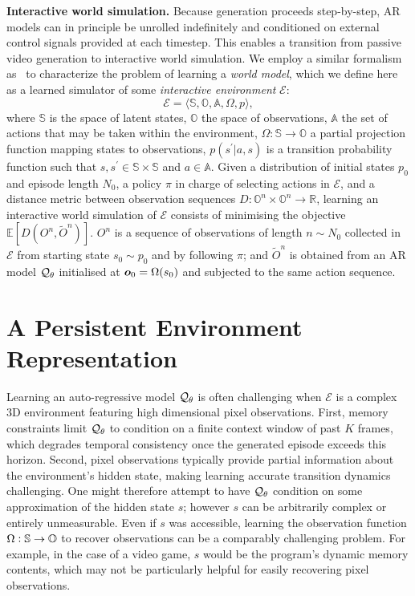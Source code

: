 \documentclass{article}
\theoremstyle{plain}
\theoremstyle{definition}
\theoremstyle{remark}
\begin{document}
\textbf{Interactive world simulation.} Because generation proceeds step-by-step, AR models can in principle be unrolled indefinitely and conditioned on external control signals provided at each timestep.
This enables a transition from passive video generation to interactive world simulation. We employ a similar formalism as~\citet{valevski2024diffusionmodelsrealtimegame} to characterize the problem of learning a \textit{world model}, which we define here as a learned simulator of some \textit{interactive environment} $\mathcal{E}$:
\begin{equation}
    \mathcal{E} = \langle \mathbb{S} , \mathbb{O}, \mathbb{A}, \Omega, p\rangle,
\end{equation}
 where $\mathbb{S}$ is the space of latent states, $\mathbb{O}$ the space of observations, $\mathbb{A}$ the set of actions that may be taken within the environment, $\Omega : \mathbb{S} \rightarrow \mathbb{O}$ a partial projection function mapping states to observations, $p(s^\prime|a,s)$ is a transition probability function such that $s,s^\prime \in \mathbb{S}\times\mathbb{S}$ and $a \in \mathbb{A}$. 
Given a distribution of initial states $p_0$ and episode length $N_0$, a policy $\pi$ in charge of selecting actions in $\mathcal{E}$, and a distance metric between observation sequences $D : \mathbb{O}^n \times \mathbb{O}^n \rightarrow \mathbb{R}$, learning an interactive world simulation of $\mathcal{E}$ consists of minimising the objective $\mathbb{E}[D(O^n, \tilde{O}^n)]$. $O^n$ is a sequence of observations of length $n\sim N_0$ collected in $\mathcal{E}$ from starting state $s_0\sim p_0$ and by following $\pi$; and $\tilde{O}^n$ is obtained from an AR model ${\mathcal{Q}}_\theta$ initialised at ${\bm{o}}_0 = \Omega(s_0)$ and subjected to the same action sequence.

\section{A Persistent Environment Representation}
Learning an auto-regressive model ${\mathcal{Q}}_\theta$ is often challenging when $\mathcal{E}$ is a complex 3D environment featuring high dimensional pixel observations.
First, memory constraints limit ${\mathcal{Q}}_\theta$ to condition on a finite context window of past $K$ frames, which degrades temporal consistency once the generated episode exceeds this horizon. 
Second, pixel observations typically provide partial information about the environment's hidden state, making learning accurate transition dynamics challenging.
One might therefore attempt to have ${\mathcal{Q}}_\theta$ condition on some approximation of the hidden state $s$; however $s$ can be arbitrarily complex or entirely unmeasurable. Even if $s$ was accessible, learning the observation function $\Omega : {\mathbb{S}} \rightarrow {\mathbb{O}} $ to recover observations can be a comparably challenging problem. For example, in the case of a video game, $s$ would be the program's dynamic memory contents, which may not be particularly helpful for easily recovering pixel observations. 
\end{document}
